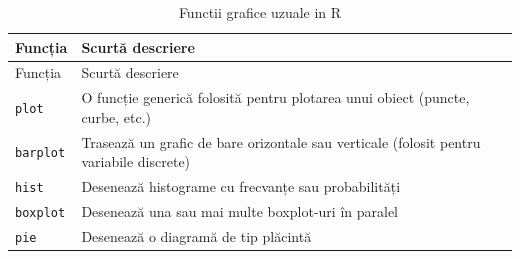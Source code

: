\documentclass[]{article}
\begin{document}
\begin{longtable}[]{@{}ll@{}}
\caption{Functii grafice uzuale in R}\tabularnewline
\toprule
\begin{minipage}[b]{0.49\columnwidth}\raggedright
Funcția\strut
\end{minipage} & \begin{minipage}[b]{0.45\columnwidth}\raggedright
Scurtă descriere\strut
\end{minipage}\tabularnewline
\midrule
\endfirsthead
\toprule
\begin{minipage}[b]{0.49\columnwidth}\raggedright
Funcția\strut
\end{minipage} & \begin{minipage}[b]{0.45\columnwidth}\raggedright
Scurtă descriere\strut
\end{minipage}\tabularnewline
\midrule
\endhead
\begin{minipage}[t]{0.49\columnwidth}\raggedright
\texttt{plot}\strut
\end{minipage} & \begin{minipage}[t]{0.45\columnwidth}\raggedright
O funcție generică folosită pentru plotarea unui obiect (puncte, curbe,
etc.)\strut
\end{minipage}\tabularnewline
\begin{minipage}[t]{0.49\columnwidth}\raggedright
\texttt{barplot}\strut
\end{minipage} & \begin{minipage}[t]{0.45\columnwidth}\raggedright
Trasează un grafic de bare orizontale sau verticale (folosit pentru
variabile discrete)\strut
\end{minipage}\tabularnewline
\begin{minipage}[t]{0.49\columnwidth}\raggedright
\texttt{hist}\strut
\end{minipage} & \begin{minipage}[t]{0.45\columnwidth}\raggedright
Desenează histograme cu frecvanțe sau probabilități\strut
\end{minipage}\tabularnewline
\begin{minipage}[t]{0.49\columnwidth}\raggedright
\texttt{boxplot}\strut
\end{minipage} & \begin{minipage}[t]{0.45\columnwidth}\raggedright
Desenează una sau mai multe boxplot-uri în paralel\strut
\end{minipage}\tabularnewline
\begin{minipage}[t]{0.49\columnwidth}\raggedright
\texttt{pie}\strut
\end{minipage} & \begin{minipage}[t]{0.45\columnwidth}\raggedright
Desenează o diagramă de tip plăcintă\strut
\end{minipage}\tabularnewline
\bottomrule
\end{longtable}
\end{document}
